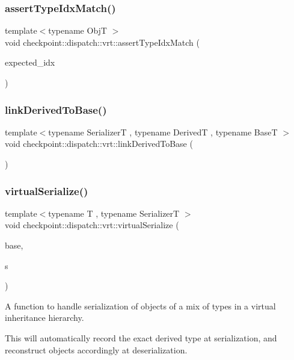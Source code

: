 \subsubsection{\texorpdfstring{assert\+Type\+Idx\+Match()}{assertTypeIdxMatch()}}
{\footnotesize\ttfamily template$<$typename ObjT $>$ \\
void checkpoint\+::dispatch\+::vrt\+::assert\+Type\+Idx\+Match (\begin{DoxyParamCaption}\item[{\hyperlink{namespacecheckpoint_1_1dispatch_1_1vrt_acd3f9e6b091bcfbc23dc35ea8ef45d3b}{Type\+Idx} const}]{expected\+\_\+idx }\end{DoxyParamCaption})\hspace{0.3cm}{\ttfamily [inline]}}

\mbox{\label{namespacecheckpoint_1_1dispatch_1_1vrt_a386bc0347756889ae1d3849cf351110e}} 
\subsubsection{\texorpdfstring{link\+Derived\+To\+Base()}{linkDerivedToBase()}}
{\footnotesize\ttfamily template$<$typename SerializerT , typename DerivedT , typename BaseT $>$ \\
void checkpoint\+::dispatch\+::vrt\+::link\+Derived\+To\+Base (\begin{DoxyParamCaption}{ }\end{DoxyParamCaption})\hspace{0.3cm}{\ttfamily [inline]}}

\mbox{\label{namespacecheckpoint_1_1dispatch_1_1vrt_ab62fa4e32b27853f6b57caf24b6a77cc}} 
\subsubsection{\texorpdfstring{virtual\+Serialize()}{virtualSerialize()}}
{\footnotesize\ttfamily template$<$typename T , typename SerializerT $>$ \\
void checkpoint\+::dispatch\+::vrt\+::virtual\+Serialize (\begin{DoxyParamCaption}\item[{T $\ast$\&}]{base,  }\item[{SerializerT \&}]{s }\end{DoxyParamCaption})}



A function to handle serialization of objects of a mix of types in a virtual inheritance hierarchy. 

This will automatically record the exact derived type at serialization, and reconstruct objects accordingly at deserialization. 